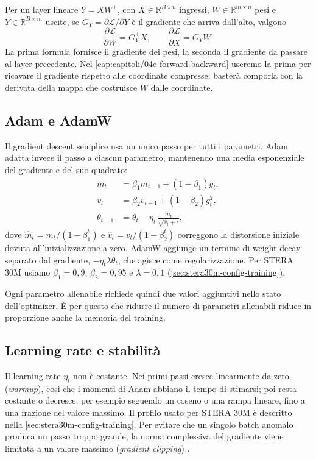Per un layer lineare $Y=XW^\top$, con $X\in\mathbb{R}^{B\times n}$ ingressi, $W\in\mathbb{R}^{m\times n}$ pesi e $Y\in\mathbb{R}^{B\times m}$ uscite, se $G_Y=\partial\mathcal{L}/\partial Y$ è il gradiente che arriva dall'alto, valgono
\begin{equation}
\frac{\partial\mathcal{L}}{\partial W} = G_Y^\top X,\qquad
\frac{\partial\mathcal{L}}{\partial X} = G_Y W.
\label{eq:linear-grad}
\end{equation}
La prima formula fornisce il gradiente dei pesi, la seconda il gradiente da passare al layer precedente. Nel \autoref{cap:capitoli/04c-forward-backward} useremo la prima per ricavare il gradiente rispetto alle coordinate compresse: basterà comporla con la derivata della mappa che costruisce $W$ dalle coordinate.

\subsection{Adam e AdamW}

Il gradient descent semplice usa un unico passo per tutti i parametri. Adam \cite{kingma2015adam} adatta invece il passo a ciascun parametro, mantenendo una media esponenziale del gradiente e del suo quadrato:
\begin{align}
m_t &= \beta_1 m_{t-1} + (1-\beta_1) g_t,\\
v_t &= \beta_2 v_{t-1} + (1-\beta_2) g_t^2,\\
\theta_{t+1} &= \theta_t - \eta_t\,\frac{\hat m_t}{\sqrt{\hat v_t}+\epsilon},
\end{align}
dove $\hat m_t=m_t/(1-\beta_1^t)$ e $\hat v_t=v_t/(1-\beta_2^t)$ correggono la distorsione iniziale dovuta all'inizializzazione a zero. AdamW \cite{loshchilov2019decoupled} aggiunge un termine di weight decay separato dal gradiente, $-\eta_t\lambda\theta_t$, che agisce come regolarizzazione. Per STERA 30M usiamo $\beta_1=0{,}9$, $\beta_2=0{,}95$ e $\lambda=0{,}1$ (\autoref{sec:stera30m-config-training}).

Ogni parametro allenabile richiede quindi due valori aggiuntivi nello stato dell'optimizer. È per questo che ridurre il numero di parametri allenabili riduce in proporzione anche la memoria del training.

\subsection{Learning rate e stabilità}

Il learning rate $\eta_t$ non è costante. Nei primi passi cresce linearmente da zero (\emph{warmup}), così che i momenti di Adam abbiano il tempo di stimarsi; poi resta costante o decresce, per esempio seguendo un coseno o una rampa lineare, fino a una frazione del valore massimo. Il profilo usato per STERA 30M è descritto nella \autoref{sec:stera30m-config-training}. Per evitare che un singolo batch anomalo produca un passo troppo grande, la norma complessiva del gradiente viene limitata a un valore massimo (\emph{gradient clipping}) \cite{pascanu2013difficulty}.


